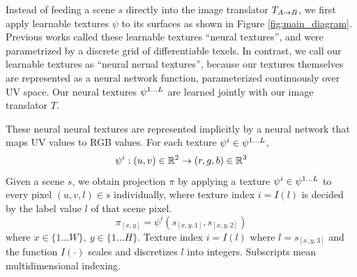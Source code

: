 \documentclass{article}
\begin{document}
		Instead of feeding a scene $s$ directly into the image translator $T_{A\rightarrow B}$, we first apply learnable textures $\psi$ to its surfaces as shown in Figure \ref{fig:main_diagram}.
		Previous works called these learnable textures ``neural textures'', and were parametrized by a discrete grid of differentiable texels. 
		In contrast, we call our learnable textures as ``neural nerual textures'', because our textures themselves are represented as a neural network function, parameterized continuously over UV space.
		Our neural textures $\psi^{1\dots L}$ are learned jointly with our image translator $T$.
		
		These neural neural textures are represented implicitly by a neural network that maps UV values to RGB values. %
		For each texture $\psi^i \in \psi^{1\dots L}$, 
		\begin{equation}
			\psi^i: (u,v) \in\real^2 \rightarrow (r,g,b) \in\real^3 %
		\end{equation}
		Given a scene $s$, we obtain projection $\pi$ by applying a texture $\psi^i \in \psi^{1\dots L}$ to every pixel $(u,v,l) \in s$ individually, where texture index $i=I(l)$ is decided by the label value $l$ of that scene pixel.
		\begin{equation}
			\pi_{[x,y]}=\psi^i(s_{[x,y,1]},s_{[x,y,2]})
		\end{equation}
		where $ x\in \{1\dots W\},\ y\in \{1\dots H\}$. Texture index $i = I(l)$ where $l=s_{[x,y,3]}$ and the function $I(\cdot)$ scales and discretizes $l$ into integers. Subscripts mean multidimensional indexing.
\end{document}
